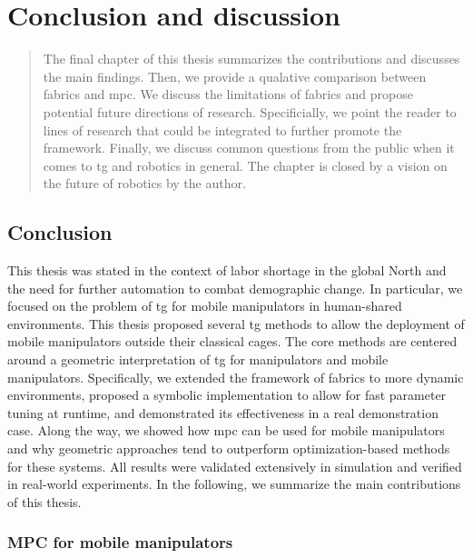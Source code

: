 \chapter{Conclusion and discussion}
\label{cha:conclusion}

\begin{abstract}
The final chapter of this thesis summarizes the contributions and discusses the
main findings. Then, we provide a qualative comparison between \ac{fabrics} and
\ac{mpc}. We discuss the limitations of \ac{fabrics} and
propose potential future directions of research.
Specificially, we point the reader to lines of research
that could be integrated to further promote the framework.
Finally, we discuss common questions from the public when
it comes to \ac{tg} and robotics in general. The chapter
is closed by a vision on the future of robotics by the
author.
\end{abstract}

\newpage

\section{Conclusion}
\label{sec:conclusion}

This thesis was stated in the context of labor shortage in the global North and
the need for further automation to combat demographic change. In particular, we
focused on the problem of \ac{tg} for mobile manipulators in human-shared
environments. This thesis proposed several \ac{tg} methods to allow the
deployment of mobile manipulators outside their classical cages.
The core methods are centered around a
geometric interpretation of \ac{tg} for
manipulators and mobile manipulators. Specifically, we extended the framework of
\ac{fabrics} to more dynamic environments, proposed a symbolic implementation to
allow for fast parameter tuning at runtime, and demonstrated its effectiveness
in a real demonstration case. Along the way, we showed how \ac{mpc} can be used
for mobile manipulators and why geometric approaches tend to outperform
optimization-based methods for these systems. All results were validated
extensively in simulation and verified in real-world experiments. In the
following, we summarize the main contributions of this thesis.

\subsection{MPC for mobile manipulators}
\label{sec:conclusion_mpc}

